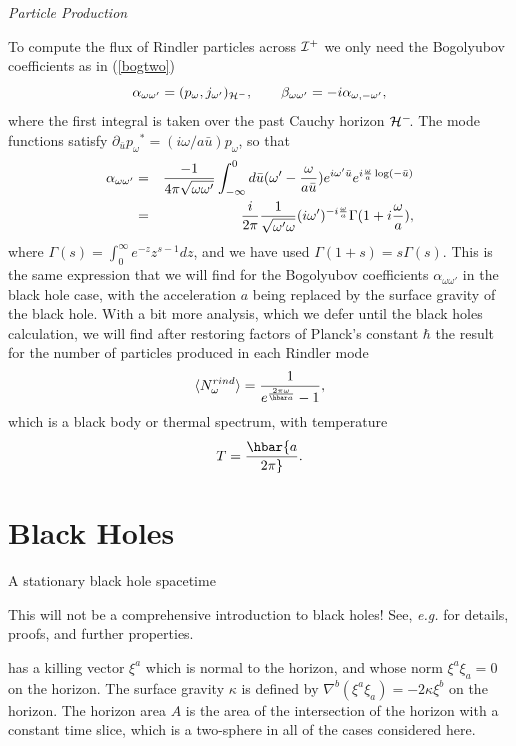 \documentclass[12pt]{article}
\newcommand{\be}{\begin{equation}}
\newcommand{\ee}{\end{equation}}
\newcommand{\p}{\partial}
\def\bena{\begin{eqnarray}}
\def\eena{\end{eqnarray}}
\def\ph{{\cal H}^-}
\def\finf{{\cal I}^+}
\def\p{p_{\omega}}
\def\alp{\alpha _{\omega \omega '}}
\def\bet{\beta_{\omega\omega '}}
\def\ub{\bar u}
\begin{document}
\vskip 0.1in\goodbreak\noindent
{\it Particle Production}
\vskip 0.05in

To compute the flux
of Rindler particles across $\finf$ we only need the Bogolyubov coefficients
as in (\ref{bogtwo})
%
\be\label{rinbog} \alp = (\p ,j_{\omega '} )_{\ph}  ,\qquad
\bet=  -i\alpha_{\omega ,-\omega '},\ee
%
where the first integral is taken over the past Cauchy horizon $\ph\!$.
The mode functions satisfy  $\partial_{\ub}\p{}^* =(i\omega / a \ub)\p $,
so that
%
\bena\label{rinalp}\alp &=& {-1\over 4\pi \sqrt{\omega \omega '}}
\int_{-\infty}^0 d\ub (\omega ' -{\omega \over a\ub } ) e^{i\omega ' \ub}
e ^{i {\omega \over a} \log(-\ub )} \\
&=&{i\over 2\pi }{1\over \sqrt{\omega ' \omega }}
(i\omega ' )^{-i {\omega \over a}}\Gamma (1 +i {\omega \over a} ), \eena
%
where $\Gamma (s) =\int _0 ^{\infty} e ^{-z} z^{s-1} dz$, and
we have used $\Gamma (1+s) =s\Gamma (s)$.
This is the same expression that we will find for the Bogolyubov coefficients
$\alp$ in the black hole case, with the acceleration $a$ being replaced by
the surface
gravity of the black hole. With a bit more analysis, which we defer until
the black
holes calculation, we will find after restoring factors of Planck's
constant $\hbar$ the
result for the number of particles produced in each Rindler mode
%
\be\label{rinspec} \langle N_{\omega }^{rind} \rangle = {1\over e^{ {2\pi \omega \over
\hbar a} } -1 } ,\ee
%
which is a black body or thermal spectrum, with temperature
%
\be\label{rintemp}T=\hbar {a\over 2\pi}.\ee
%

\section{Black Holes}
\label{section4}

A stationary black hole spacetime\begin{footnote}
{This will not be a comprehensive introduction
to black holes! See, {\it e.g.} \cite{wald} for details, proofs, and
further properties.}
\end{footnote}
has a
killing vector $\xi^a$ which is normal to the horizon, and whose norm $\xi
^a \xi _a =0$ on the
horizon. The surface gravity $\kappa$ is defined by
$\nabla ^b (\xi ^a \xi _a )=-2\kappa \xi ^b$ on the horizon. The horizon area
$A$ is the area of the intersection of the horizon with a constant time
slice, which is a
two-sphere in all of the cases considered here.
\end{document}

